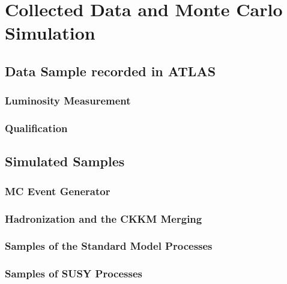 \section{Collected Data and Monte Carlo Simulation}
	\subsection{Data Sample recorded in ATLAS}
		\subsubsection{Luminosity Measurement}
		\subsubsection{Qualification}
	\subsection{Simulated Samples}
		\subsubsection{MC Event Generator}
		\subsubsection{Hadronization and the CKKM Merging}
		\subsubsection{Samples of the Standard Model Processes}
		\subsubsection{Samples of SUSY Processes}
